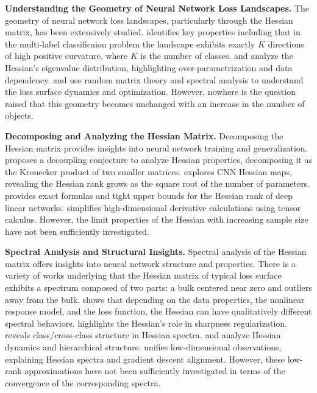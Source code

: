 \documentclass{article}
\begin{document}
\textbf{Understanding the Geometry of Neural Network Loss Landscapes.}
The geometry of neural network loss landscapes, particularly through the Hessian matrix, has been extensively studied. \cite{fort2019emergentpropertieslocalgeometry} identifies key properties including that in the multi-label classificaion problem the landscape exhibits exactly $K$ directions of high positive curvature, where $K$ is the number of classes. \cite{sagun2017eigenvalueshessiandeeplearning} and \cite{sagun2018empiricalanalysishessianoverparametrized} analyze the Hessian's eigenvalue distribution, highlighting over-parametrization and data dependency. \cite{pmlr-v70-pennington17a} and \cite{pmlr-v97-ghorbani19b} use random matrix theory and spectral analysis to understand the loss surface dynamics and optimization. However, nowhere is the question raised that this geometry becomes unchanged with an increase in the number of objects.

\textbf{Decomposing and Analyzing the Hessian Matrix.}
Decomposing the Hessian matrix provides insights into neural network training and generalization. \cite{wu2022dissectinghessianunderstandingcommon} proposes a decoupling conjecture to analyze Hessian properties, decomposing it as the Kronecker product of two smaller matrices. \cite{singh2023hessianperspectivenatureconvolutional} explores CNN Hessian maps, revealing the Hessian rank grows as the square root of the number of parameters. \cite{singh2021analyticinsightsstructurerank} provides exact formulas and tight upper bounds for the Hessian rank of deep linear networks. \cite{skorski2019chainruleshessianhigher} simplifies high-dimensional derivative calculations using tensor calculus. However, the limit properties of the Hessian with increasing sample size have not been sufficiently investigated. 

\textbf{Spectral Analysis and Structural Insights.}
Spectral analysis of the Hessian matrix offers insights into neural network structure and properties. There is a variety of works \cite{sagun2018empiricalanalysishessianoverparametrized,pmlr-v97-ghorbani19b,papyan2019spectrumdeepnethessiansscale} underlying that the Hessian matrix of typical loss surface exhibits a spectrum composed of two parts: a bulk centered near zero and outliers away from the bulk. \cite{liao2021hessianeigenspectrarealisticnonlinear} shows that depending on the data properties, the nonlinear response model, and the loss function, the Hessian can have qualitatively different spectral behaviors. \cite{dauphin2024neglectedhessiancomponentexplains} highlights the Hessian's role in sharpness regularization. \cite{papyan2020tracesclasscrossclassstructurepervade} reveals class/cross-class structure in Hessian spectra. \cite{papyan2019spectrumdeepnethessiansscale} and \cite{papyan2019measurementsthreelevelhierarchicalstructure} analyze Hessian dynamics and hierarchical structure. \cite{garrod2024unifyinglowdimensionalobservations} unifies low-dimensional observations, explaining Hessian spectra and gradient descent alignment. However, these low-rank approximations have not been sufficiently investigated in terms of the convergence of the corresponding spectra.
\end{document}
